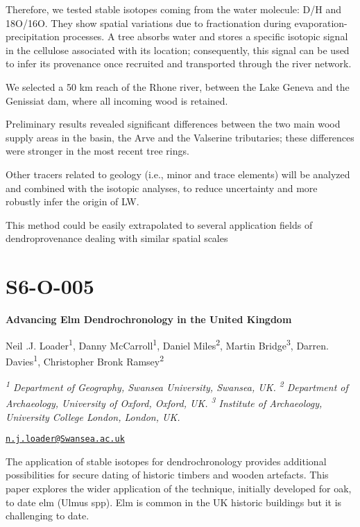 \documentclass[
]{book}
\begin{document}
Therefore, we tested stable isotopes coming from the water molecule: D/H and 18O/16O. They show spatial variations due to fractionation during evaporation-precipitation processes. A tree absorbs water and stores a specific isotopic signal in the cellulose associated with its location; consequently, this signal can be used to infer its provenance once recruited and transported through the river network.

We selected a 50 km reach of the Rhone river, between the Lake Geneva and the Genissiat dam, where all incoming wood is retained.

Preliminary results revealed significant differences between the two main wood supply areas in the basin, the Arve and the Valserine tributaries; these differences were stronger in the most recent tree rings.

Other tracers related to geology (i.e., minor and trace elements) will be analyzed and combined with the isotopic analyses, to reduce uncertainty and more robustly infer the origin of LW.

This method could be easily extrapolated to several application fields of dendroprovenance dealing with similar spatial scales

\hypertarget{s6-o-005}{%
\section*{S6-O-005}\label{s6-o-005}}

\textbf{Advancing Elm Dendrochronology in the United Kingdom}

Neil .J. Loader\textsuperscript{1}, Danny McCarroll\textsuperscript{1}, Daniel Miles\textsuperscript{2}, Martin Bridge\textsuperscript{3}, Darren. Davies\textsuperscript{1}, Christopher Bronk Ramsey\textsuperscript{2}

\emph{\textsuperscript{1} Department of Geography, Swansea University, Swansea, UK. \textsuperscript{2} Department of Archaeology, University of Oxford, Oxford, UK. \textsuperscript{3} Institute of Archaeology, University College London, London, UK.}

\href{mailto:n.j.loader@Swansea.ac.uk}{\nolinkurl{n.j.loader@Swansea.ac.uk}}

The application of stable isotopes for dendrochronology provides additional possibilities for secure dating of historic timbers and wooden artefacts. This paper explores the wider application of the technique, initially developed for oak, to date elm (Ulmus spp). Elm is common in the UK historic buildings but it is challenging to date.
\end{document}
